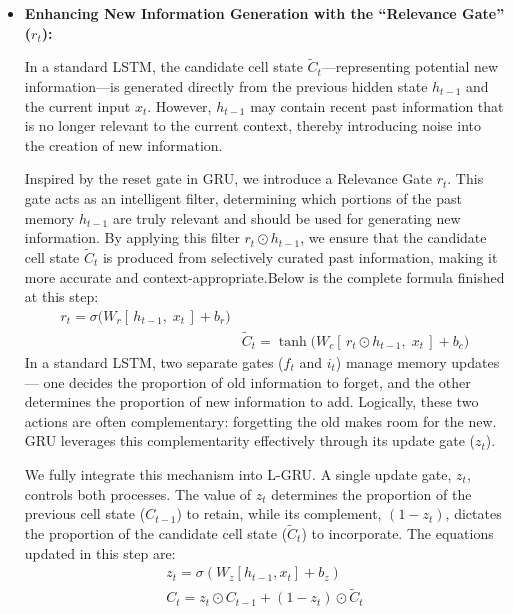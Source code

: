 \documentclass{cys}
\begin{document}
  \begin{itemize}
    \item \textbf{Enhancing New Information Generation with the ``Relevance Gate'' (\(r_t\)):}

  In a standard LSTM, the candidate cell state \(\tilde{C}_t\)---representing potential new information---is generated directly from the previous hidden state \(h_{t-1}\) and the current input \(x_t\). However, \(h_{t-1}\) may contain recent past information that is no longer relevant to the current context, thereby introducing noise into the creation of new information.

  Inspired by the reset gate in GRU, we introduce a Relevance Gate \(r_t\). This gate acts as an intelligent filter, determining which portions of the past memory \(h_{t-1}\) are truly relevant and should be used for generating new information. By applying this filter \(r_t \odot h_{t-1}\), we ensure that the candidate cell state \(\tilde{C}_t\) is produced from selectively curated past information, making it more accurate and context-appropriate.Below is the complete formula finished at this step:
    \begin{multline}
  r_t = \sigma\!\big( W_r \left[\, h_{t-1},\; x_t \,\right] + b_r \big) \\&
  \tilde{C}_t = \tanh\!\big( W_c \left[\, r_t \odot h_{t-1},\; x_t \,\right] + b_c \big)
   \end{multline}
   In a standard LSTM, two separate gates ($f_t$ and $i_t$) manage memory updates --- 
   one decides the proportion of old information to forget, and the other determines 
   the proportion of new information to add. Logically, these two actions are often 
   complementary: forgetting the old makes room for the new. GRU leverages this 
   complementarity effectively through its update gate ($z_t$).

   We fully integrate this mechanism into L-GRU. A single update gate, $z_t$, 
   controls both processes. The value of $z_t$ determines the proportion of the 
   previous cell state ($C_{t-1}$) to retain, while its complement, $(1 - z_t)$, 
   dictates the proportion of the candidate cell state ($\tilde{C}_t$) to incorporate. 
   The equations updated in this step are:
\begin{multline}
    z_t = \sigma\left(W_z [h_{t-1}, x_t] + b_z\right) \\
    C_t = z_t \odot C_{t-1} + (1 - z_t) \odot \tilde{C}_t
\end{multline}



\end{itemize}
\end{document}
